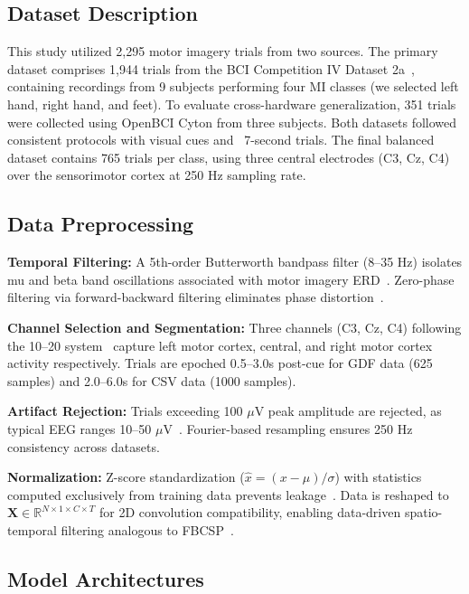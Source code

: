 \subsection{Dataset Description}

This study utilized 2,295 motor imagery trials from two sources. The primary dataset comprises 1,944 trials from the BCI Competition IV Dataset 2a~\cite{brunner2008graz,BCI2008GrazDataset}, containing recordings from 9 subjects performing four MI classes (we selected left hand, right hand, and feet). To evaluate cross-hardware generalization, 351 trials were collected using OpenBCI Cyton from three subjects. Both datasets followed consistent protocols with visual cues and ~7-second trials. The final balanced dataset contains 765 trials per class, using three central electrodes (C3, Cz, C4) over the sensorimotor cortex at 250 Hz sampling rate.

\subsection{Data Preprocessing}

\textbf{Temporal Filtering:} A 5th-order Butterworth bandpass filter (8--35 Hz) isolates mu and beta band oscillations associated with motor imagery ERD~\cite{pfurtscheller1999}. Zero-phase filtering via forward-backward filtering eliminates phase distortion~\cite{oppenheim1999}.

\textbf{Channel Selection and Segmentation:} Three channels (C3, Cz, C4) following the 10--20 system~\cite{jasper1958} capture left motor cortex, central, and right motor cortex activity respectively. Trials are epoched 0.5--3.0s post-cue for GDF data (625 samples) and 2.0--6.0s for CSV data (1000 samples).

\textbf{Artifact Rejection:} Trials exceeding 100 $\mu$V peak amplitude are rejected, as typical EEG ranges 10--50 $\mu$V~\cite{luck2014}. Fourier-based resampling ensures 250 Hz consistency across datasets.

\textbf{Normalization:} Z-score standardization ($\hat{x} = (x - \mu)/\sigma$) with statistics computed exclusively from training data prevents leakage~\cite{kaufman2012}. Data is reshaped to $\mathbf{X} \in \mathbb{R}^{N \times 1 \times C \times T}$ for 2D convolution compatibility, enabling data-driven spatio-temporal filtering analogous to FBCSP~\cite{ang2008}.

\subsection{Model Architectures}

